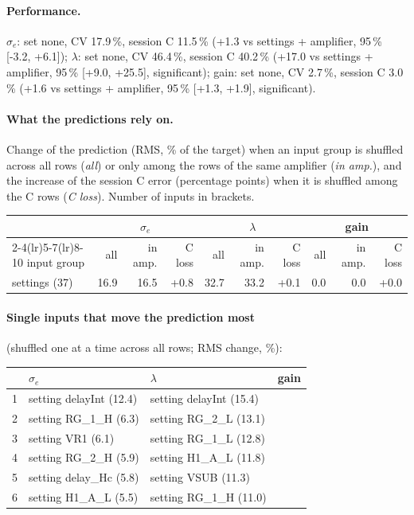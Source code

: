 \paragraph{Performance.}
$\sigma_e$: set none, CV 17.9\,\%, session C 11.5\,\% (+1.3 vs settings + amplifier, 95\,\% [-3.2, +6.1]); $\lambda$: set none, CV 46.4\,\%, session C 40.2\,\% (+17.0 vs settings + amplifier, 95\,\% [+9.0, +25.5], significant); gain: set none, CV 2.7\,\%, session C 3.0\,\% (+1.6 vs settings + amplifier, 95\,\% [+1.3, +1.9], significant).
\paragraph{What the predictions rely on.} Change of the prediction (RMS, \% of the target) when an input group is shuffled across all rows (\emph{all}) or only among the rows of the same amplifier (\emph{in amp.}), and the increase of the session C error (percentage points) when it is shuffled among the C rows (\emph{C loss}). Number of inputs in brackets.
\begin{center}\footnotesize
\begin{tabular}{lrrrrrrrrr}
\toprule
 & \multicolumn{3}{c}{$\sigma_e$} & \multicolumn{3}{c}{$\lambda$} & \multicolumn{3}{c}{gain} \\
\cmidrule(lr){2-4}\cmidrule(lr){5-7}\cmidrule(lr){8-10}
input group & all & in amp. & C loss & all & in amp. & C loss & all & in amp. & C loss \\
\midrule
settings (37) & 16.9 & 16.5 & +0.8 & 32.7 & 33.2 & +0.1 & 0.0 & 0.0 & +0.0 \\
\bottomrule
\end{tabular}
\end{center}
\paragraph{Single inputs that move the prediction most} (shuffled one at a time across all rows; RMS change, \%):
\begin{center}\footnotesize
\begin{tabular}{rp{}p{}p{}}
\toprule
 & $\sigma_e$ & $\lambda$ & gain \\
\midrule
1 & setting delayInt (12.4) & setting delayInt (15.4) &  \\
2 & setting RG\_1\_H (6.3) & setting RG\_2\_L (13.1) &  \\
3 & setting VR1 (6.1) & setting RG\_1\_L (12.8) &  \\
4 & setting RG\_2\_H (5.9) & setting H1\_A\_L (11.8) &  \\
5 & setting delay\_Hc (5.8) & setting VSUB (11.3) &  \\
6 & setting H1\_A\_L (5.5) & setting RG\_1\_H (11.0) &  \\
\bottomrule
\end{tabular}
\end{center}
